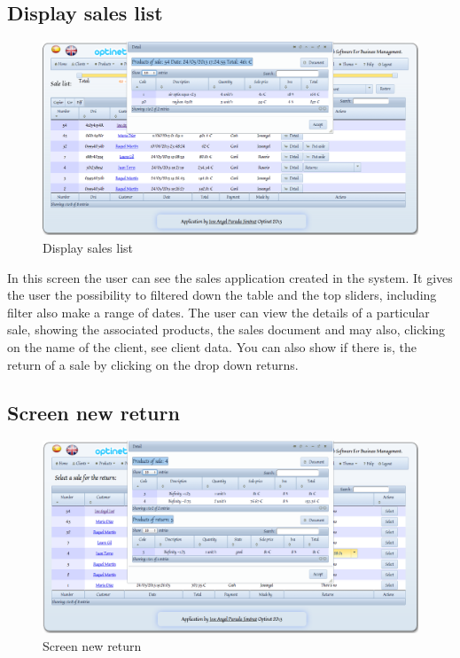 \documentclass[a4paper,11pt]{book}
\begin{document}
\subsection {Display sales list}

\begin{figure}[!htb]
  \centering
    \includegraphics[scale=0.35]{icaplistarventas.png}
  \caption{Display sales list}
  \label{a}
\end{figure}

In this screen the user can see the sales application created in the system. It gives the user the possibility to filtered down the table and the top sliders, including filter also make a range of dates. The user can view the details of a particular sale, showing the associated products, the sales document and may also, clicking on the name of the client, see client data. You can also show if there is, the return of a sale by clicking on the drop down returns.

\newpage
\subsection {Screen new return}

\begin{figure}[!htb]
  \centering
    \includegraphics[scale=0.35]{icapnuevadevolucion.png}
  \caption{Screen new return}
  \label{a}
\end{figure}
\end{document}
